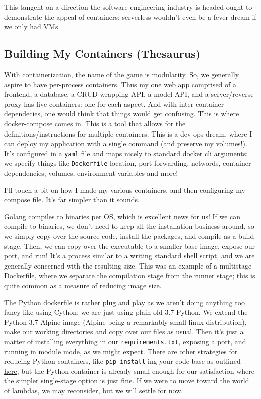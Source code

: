 \documentclass[11pt, twoside, reqno]{book}
\begin{document}
This tangent on a direction the software engineering industry is headed ought to demonstrate the appeal of containers: serverless wouldn't even be a fever dream if we only had VMs.

\subsection{Building My Containers (Thesaurus)}

With containerization, the name of the game is modularity. So, we generally aspire to have per-process containers. Thus my one web app comprised of a frontend, a database, a CRUD-wrapping API, a model API, and a server/reverse-proxy has five containers: one for each aspect. And with inter-container dependecies, one would think that things would get confusing. This is where docker-compose comes in. This is a tool that allows for the definitions/instructions for multiple containers. This is a dev-ops dream, where I can deploy my application with a single command (and preserve my volumes!). It's configured in a \texttt{yaml} file and maps nicely to standard docker cli arguments: we specify things like \texttt{Dockerfile} location, port forwarding, networds, container dependencies, volumes, environment variables and more!

I'll touch a bit on how I made my various containers, and then configuring my compose file. It's far simpler than it sounds.

\label{Go CRUD Backend Dockerfile}

Golang compiles to binaries per OS, which is excellent news for us! If we can compile to binaries, we don't need to keep all the installation business around, so we simply copy over the source code, install the packages, and compile as a build stage. Then, we can copy over the executable to a smaller base image, expose our port, and run! It's a process similar to a writing standard shell script, and we are generally concerned with the resulting size. This was an example of a multistage Dockerfile, where we separate the compilation stage from the runner stage; this is quite common as a measure of reducing image size.

\label{Python Model Backend Dockerfile}

The Python dockerfile is rather plug and play as we aren't doing anything too fancy like using Cython; we are just using plain old 3.7 Python. We extend the Python 3.7 Alpine image (Alpine being a remarkably small linux distribution), make our working directories and copy over our files as usual. Then it's just a matter of installing everything in our \texttt{requirements.txt}, exposing a port, and running in module mode, as we might expect. There are other strategies for reducing Python containers, like \texttt{pip install}-ing your code base as outlined \href{https://pythonspeed.com/articles/multi-stage-docker-python/}{here}, but the Python container is already small enough for our satisfaction where the simpler single-stage option is just fine. If we were to move toward the world of lambdas, we may reconsider, but we will settle for now.
\end{document}
